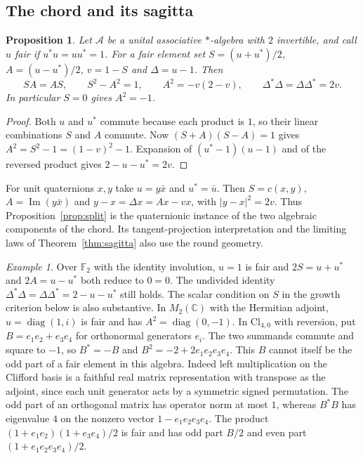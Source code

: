 \documentclass[11pt,reqno]{amsart}
\newtheorem{proposition}[theorem]{Proposition}
\theoremstyle{definition}
\theoremstyle{remark}
\newtheorem{example}[theorem]{Example}
\numberwithin{equation}{section}
\begin{document}
\subsection{The chord and its sagitta}

\begin{proposition}\label{m1:algebra}
Let \(\mathcal A\) be a unital associative \(*\)-algebra with \(2\)
invertible, and call \(u\) \emph{fair} if \(u^*u=uu^*=1\).
For a fair element set \(S=(u+u^*)/2\), \(A=(u-u^*)/2\),
\(v=1-S\) and \(\Delta=u-1\). Then
\begin{equation}\label{m1:chord-eq}
 SA=AS,\qquad S^2-A^2=1,\qquad
 A^2=-v(2-v),\qquad \Delta^*\Delta=\Delta\Delta^*=2v .
\end{equation}
In particular \(S=0\) gives \(A^2=-1\).
\end{proposition}
\begin{proof}
Both \(u\) and \(u^*\) commute because each product is \(1\), so their
linear combinations \(S\) and \(A\) commute. Now
\((S+A)(S-A)=1\) gives \(A^2=S^2-1=(1-v)^2-1\).
Expansion of \((u^*-1)(u-1)\) and of the reversed product gives
\(2-u-u^*=2v\).
\end{proof}

For unit quaternions \(x,y\) take \(u=y\bar x\) and \(u^*=\bar u\).
Then \(S=c(x,y)\), \(A=\operatorname{Im}(y\bar x)\) and
\(y-x=\Delta x=Ax-vx\), with \(|y-x|^2=2v\). Thus
Proposition~\ref{prop:split} is the quaternionic instance of the two
algebraic components of the chord. Its tangent-projection interpretation
and the limiting laws of Theorem~\ref{thm:sagitta} also use the round
geometry.

\begin{example}\label{m1:algebra-boundaries}
Over \(\mathbb F_2\) with the identity involution, \(u=1\) is fair
and \(2S=u+u^*\) and \(2A=u-u^*\) both reduce to \(0=0\).
The undivided identity
\(\Delta^*\Delta=\Delta\Delta^*=2-u-u^*\) still holds. The scalar
condition on \(S\) in the growth criterion below is also substantive.
In \(M_2(\mathbb C)\) with the Hermitian adjoint,
\(u=\operatorname{diag}(1,i)\) is fair and has
\(A^2=\operatorname{diag}(0,-1)\). In \(\mathrm{Cl}_{4,0}\) with
reversion, put \(B=e_1e_2+e_3e_4\) for orthonormal generators \(e_i\).
The two summands commute and square to \(-1\), so
\(B^*=-B\) and \(B^2=-2+2e_1e_2e_3e_4\). This \(B\) cannot itself
be the odd part of a fair element in this algebra. Indeed left
multiplication on the Clifford basis is a faithful real matrix
representation with transpose as the adjoint, since each unit
generator acts by a symmetric signed permutation. The odd part of
an orthogonal matrix has operator norm at most \(1\), whereas \(B^*B\)
has eigenvalue \(4\) on the nonzero vector \(1-e_1e_2e_3e_4\). The product
\((1+e_1e_2)(1+e_3e_4)/2\) is fair and has odd part \(B/2\)
and even part \((1+e_1e_2e_3e_4)/2\).
\end{example}
\end{document}
